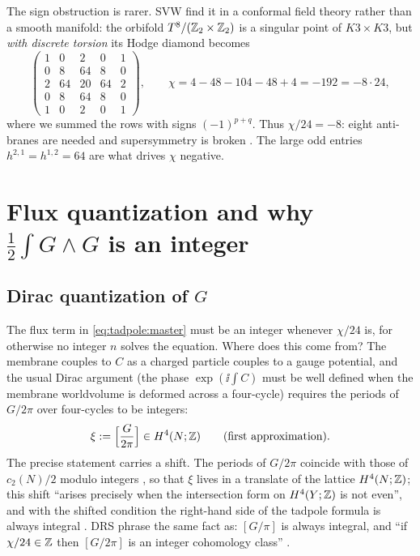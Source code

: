 The sign obstruction is rarer. SVW find it in a conformal field theory rather than a smooth
manifold: the orbifold $T^8/(\mathbb{Z}_2\times\mathbb{Z}_2)$ is a singular point of $K3\times K3$, but
\emph{with discrete torsion} its Hodge diamond becomes
\begin{equation}\label{eq:tadpole:torsion}
 \begin{pmatrix}1&0&2&0&1\\0&8&64&8&0\\2&64&20&64&2\\0&8&64&8&0\\1&0&2&0&1\end{pmatrix},
 \qquad \chi=4-48-104-48+4=-192=-8\cdot24 ,
\end{equation}
where we summed the rows with signs $(-1)^{p+q}$. Thus $\chi/24=-8$: eight anti-branes are
needed and supersymmetry is broken . The large odd entries
$h^{2,1}=h^{1,2}=64$ are what drives $\chi$ negative.

\section{Flux quantization and why \texorpdfstring{$\tfrac12\int G\wedge G$}{half of G wedge G}
is an integer}\label{sec:tadpole:integrality}

\subsection{Dirac quantization of \texorpdfstring{$G$}{G}}
The flux term in \eqref{eq:tadpole:master} must be an integer whenever $\chi/24$ is, for
otherwise no integer $n$ solves the equation. Where does this come from? The membrane
couples to $C$ as a charged particle couples to a gauge potential, and the usual Dirac
argument (the phase $\exp(\ii\int C)$ must be well defined when the membrane worldvolume is
deformed across a four-cycle) requires the periods of $G/2\pi$ over four-cycles to be
integers:
\begin{equation}\label{eq:tadpole:dirac}
 \xi:=\Bigl[\frac{G}{2\pi}\Bigr]\in H^4(N;\mathbb{Z})\qquad\text{(first approximation).}
\end{equation}
The precise statement carries a shift. The periods of $G/2\pi$ coincide with those of
$c_2(N)/2$ modulo integers , so that $\xi$ lives in a
translate of the lattice $H^4(N;\mathbb{Z})$; this shift ``arises precisely when the intersection
form on $H^4(Y;\mathbb{Z})$ is not even'', and with the shifted condition the right-hand side of the
tadpole formula is always integral . DRS phrase the same fact
as: $[G/\pi]$ is always integral, and ``if $\chi/24\in\mathbb{Z}$ then $[G/2\pi]$ is an integer
cohomology class'' . \TL

